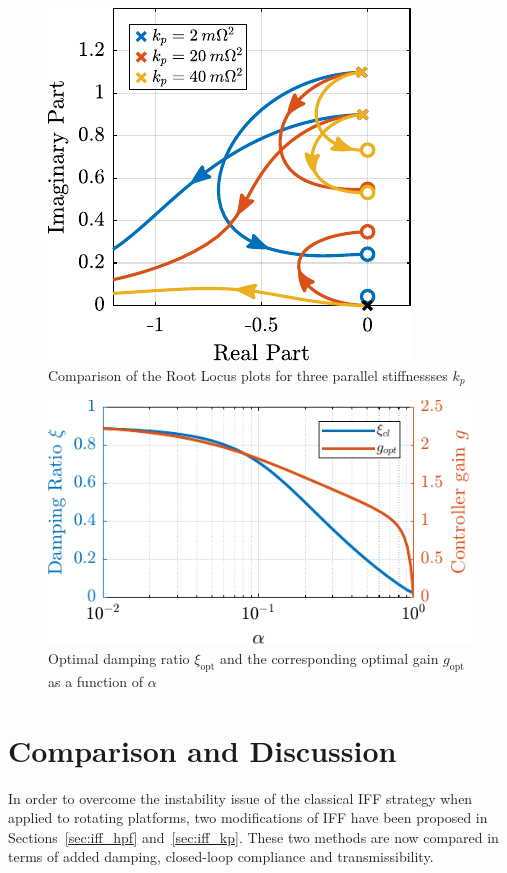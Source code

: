 \documentclass[10pt]{iopart}
\begin{document}
\begin{figure}[htbp]
\centering
\includegraphics[scale=1,scale=1]{figs/fig15.pdf}
\caption{\label{fig:root_locus_iff_kps}Comparison of the Root Locus plots for three parallel stiffnessses \(k_p\)}
\end{figure}


\begin{figure}[htbp]
\centering
\includegraphics[scale=1,scale=0.95]{figs/fig16.pdf}
\caption{\label{fig:opt_damp_alpha}Optimal damping ratio \(\xi_\text{opt}\) and the corresponding optimal gain \(g_\text{opt}\) as a function of \(\alpha\)}
\end{figure}

\section{Comparison and Discussion}
\label{sec:org3688d53}
\label{sec:comparison}
In order to overcome the instability issue of the classical IFF strategy when applied to rotating platforms, two modifications of IFF have been proposed in Sections~\ref{sec:iff_hpf} and~\ref{sec:iff_kp}.
These two methods are now compared in terms of added damping, closed-loop compliance and transmissibility.
\end{document}
